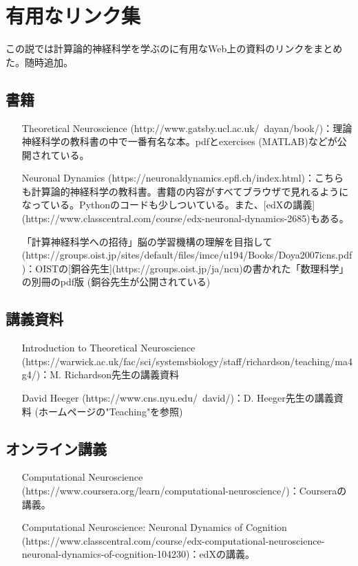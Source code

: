 \section{有用なリンク集
}
この説では計算論的神経科学を学ぶのに有用なWeb上の資料のリンクをまとめた。随時追加。



\subsection{書籍
}
\begin{itemize}
\item [Theoretical Neuroscience](http://www.gatsby.ucl.ac.uk/~dayan/book/)：理論神経科学の教科書の中で一番有名な本。pdfとexercises (MATLAB)などが公開されている。

\item [Neuronal Dynamics](https://neuronaldynamics.epfl.ch/index.html)：こちらも計算論的神経科学の教科書。書籍の内容がすべてブラウザで見れるようになっている。Pythonのコードも少しついている。また、[edXの講義](https://www.classcentral.com/course/edx-neuronal-dynamics-2685)もある。

\item [「計算神経科学への招待」脳の学習機構の理解を目指して](https://groups.oist.jp/sites/default/files/imce/u194/Books/Doya2007icns.pdf)：OISTの[銅谷先生](https://groups.oist.jp/ja/ncu)の書かれた「数理科学」の別冊のpdf版 (銅谷先生が公開されている) 

\end{itemize}


\subsection{講義資料
}
\begin{itemize}
\item [Introduction to Theoretical Neuroscience](https://warwick.ac.uk/fac/sci/systemsbiology/staff/richardson/teaching/ma4g4/)：M. Richardson先生の講義資料

\item [David Heeger](https://www.cns.nyu.edu/~david/)：D. Heeger先生の講義資料 (ホームページの"Teaching"を参照) 

\end{itemize}


\subsection{オンライン講義
}
\begin{itemize}
\item [Computational Neuroscience](https://www.coursera.org/learn/computational-neuroscience/)：Courseraの講義。

\item [Computational Neuroscience: Neuronal Dynamics of Cognition](https://www.classcentral.com/course/edx-computational-neuroscience-neuronal-dynamics-of-cognition-104230)：edXの講義。

\end{itemize}


